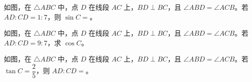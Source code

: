 \documentclass{exam-zh}
\begin{document}
\begin{question}[points=8]
  \noindent
  \begin{minipage}[t]{\dimexpr\linewidth-60mm-6mm\relax}
    \vspace{0pt}
    如图，在 $\triangle ABC$ 中，点 $D$ 在线段 $AC$ 上，$BD\perp BC$，且 $\angle ABD=\angle ACB$。若 $AD:CD=1:7$，则 $\sin C=$\fillin。
    
  \end{minipage}\hfill
  \begin{diagramcoltikz}{60mm}{第 1 题图}
  }
  \end{diagramcoltikz}
\end{question}




\begin{problem}[points=12]
  \noindent
  \begin{minipage}[t]{\dimexpr\linewidth-60mm-6mm\relax}
    \vspace{0pt}
    如图，在 $\triangle ABC$ 中，点 $D$ 在线段 $AC$ 上，$BD\perp BC$，且
$\angle ABD=\angle ACB$。若 $AD:CD=9:7$，求 $\cos C$。

    
  \end{minipage}\hfill
  \begin{diagramcoltikz}{60mm}{第 2 题图}
  }
  \end{diagramcoltikz}
  \par\medskip
  \answerarea[45mm]
\end{problem}



\begin{question}[points=8]
  \noindent
  \begin{minipage}[t]{\dimexpr\linewidth-60mm-6mm\relax}
    \vspace{0pt}
    如图，在 $\triangle ABC$ 中，点 $D$ 在线段 $AC$ 上，$BD\perp BC$，且 $\angle ABD=\angle ACB$。若 $\tan C=\dfrac25$，则 $AD:CD=$\fillin。
    
  \end{minipage}\hfill
  \begin{diagramcoltikz}{60mm}{第 3 题图}
  }
  \end{diagramcoltikz}
\end{question}
\end{document}
